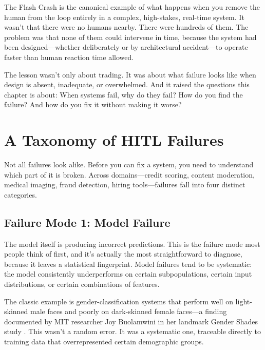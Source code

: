 The Flash Crash is the canonical example of what happens when you remove the human from the loop entirely in a complex, high-stakes, real-time system. It wasn't that there were no humans nearby. There were hundreds of them. The problem was that none of them could intervene in time, because the system had been designed---whether deliberately or by architectural accident---to operate faster than human reaction time allowed.

The lesson wasn't only about trading. It was about what failure looks like when \hitl design is absent, inadequate, or overwhelmed. And it raised the questions this chapter is about: When \hitl systems fail, why do they fail? How do you find the failure? And how do you fix it without making it worse?

\section{A Taxonomy of HITL Failures}
\label{sec:hitl-taxonomy}

Not all \hitl failures look alike. Before you can fix a system, you need to understand which part of it is broken. Across domains---credit scoring, content moderation, medical imaging, fraud detection, hiring tools---\hitl failures fall into four distinct categories.

\subsection{Failure Mode 1: Model Failure}

The model itself is producing incorrect predictions. This is the failure mode most people think of first, and it's actually the most straightforward to diagnose, because it leaves a statistical fingerprint. Model failures tend to be systematic: the model consistently underperforms on certain subpopulations, certain input distributions, or certain combinations of features.

The classic example is gender-classification systems that perform well on light-skinned male faces and poorly on dark-skinned female faces---a finding documented by MIT researcher Joy Buolamwini in her landmark Gender Shades study \autocite{buolamwini2018gender}. This wasn't a random error. It was a systematic one, traceable directly to training data that overrepresented certain demographic groups.

